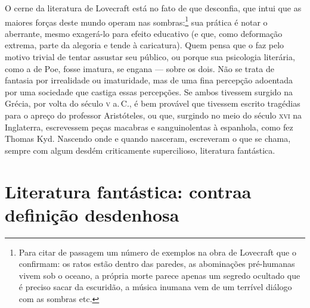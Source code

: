 O cerne da literatura de Lovecraft está no fato de que desconfia,
que intui que as maiores forças deste mundo operam nas sombras:\footnote{Para
  citar de passagem um número de exemplos na obra de Lovecraft que o
  confirmam: os ratos estão dentro das paredes, as abominações
  pré-humanas vivem sob o oceano, a própria morte parece apenas um
  segredo ocultado que é preciso sacar da escuridão, a música inumana
  vem de um terrível diálogo com as sombras etc.} sua prática é notar o aberrante, mesmo exagerá-lo para efeito educativo (e que,
como deformação extrema, parte da alegoria e tende à caricatura). Quem
pensa que o faz pelo motivo trivial de tentar assustar seu público, ou
porque sua psicologia literária, como a de Poe, fosse imatura, se engana
--- sobre os dois. Não se trata de fantasia por irrealidade ou
imaturidade, mas de uma fina percepção adoentada por uma sociedade que
castiga essas percepções. Se ambos tivessem surgido na Grécia, por volta do
século \textsc{v} a.\,C., é bem provável que tivessem escrito tragédias para o
apreço do professor Aristóteles, ou que, surgindo no meio do século \textsc{xvi}
na Inglaterra, escrevessem peças macabras e sanguinolentas à espanhola,
como fez Thomas Kyd. Nascendo onde e quando nasceram, escreveram o que
se chama, sempre com algum desdém criticamente supercilioso,
literatura fantástica.


\section{Literatura fantástica: contra\break a definição desdenhosa}

